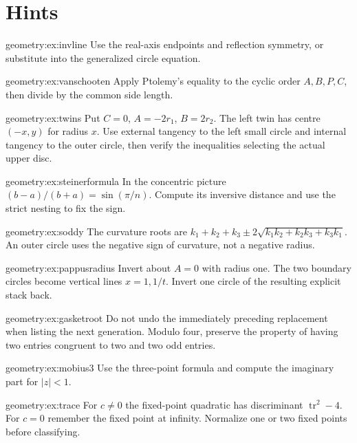 \section{Hints}

\begin{hint}{geometry:ex:invline}
Use the real-axis endpoints and reflection symmetry, or substitute into the generalized circle equation.
\end{hint}
\begin{hint}{geometry:ex:vanschooten}
Apply Ptolemy's equality to the cyclic order $A,B,P,C$, then divide by the common side length.
\end{hint}
\begin{hint}{geometry:ex:twins}
Put $C=0$, $A=-2r_1$, $B=2r_2$. The left twin has centre $(-x,y)$ for radius $x$. Use external tangency to the left small circle and internal tangency to the outer circle, then verify the inequalities selecting the actual upper disc.
\end{hint}
\begin{hint}{geometry:ex:steinerformula}
In the concentric picture $(b-a)/(b+a)=\sin(\pi/n)$. Compute its inversive distance and use the strict nesting to fix the sign.
\end{hint}
\begin{hint}{geometry:ex:soddy}
The curvature roots are $k_1+k_2+k_3\pm2\sqrt{k_1k_2+k_2k_3+k_3k_1}$. An outer circle uses the negative sign of curvature, not a negative radius.
\end{hint}
\begin{hint}{geometry:ex:pappusradius}
Invert about $A=0$ with radius one. The two boundary circles become vertical lines $x=1,1/t$. Invert one circle of the resulting explicit stack back.
\end{hint}
\begin{hint}{geometry:ex:gasketroot}
Do not undo the immediately preceding replacement when listing the next generation. Modulo four, preserve the property of having two entries congruent to two and two odd entries.
\end{hint}
\begin{hint}{geometry:ex:mobius3}
Use the three-point formula and compute the imaginary part for $|z|<1$.
\end{hint}
\begin{hint}{geometry:ex:trace}
For $c\ne0$ the fixed-point quadratic has discriminant $\operatorname{tr}^2-4$. For $c=0$ remember the fixed point at infinity. Normalize one or two fixed points before classifying.
\end{hint}
